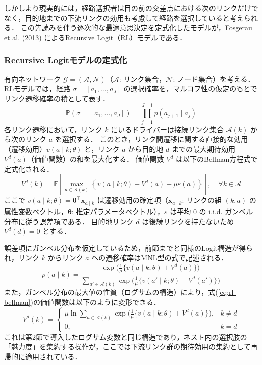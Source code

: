 しかしより現実的には，経路選択者は目の前の交差点における次のリンクだけでなく，目的地までの下流リンクの効用も考慮して経路を選択していると考えられる．
この先読みを伴う逐次的な最適意思決定を定式化したモデルが，Fosgerau et al. (2013) \cite{Fosgerau2013} によるRecursive Logit（RL）モデルである．

\subsubsection{Recursive Logitモデルの定式化}
有向ネットワーク $\mathcal{G} = (\mathcal{A}, \mathcal{N})$（$\mathcal{A}$: リンク集合，$\mathcal{N}$: ノード集合）を考える．
RLモデルでは，経路 $\sigma = [a_1, \ldots, a_J]$ の選択確率を，マルコフ性の仮定のもとでリンク遷移確率の積として表す．
\begin{equation}\label{eq:rl-path}
  \mathbb{P}(\sigma = [a_1, \ldots, a_J]) = \prod_{j=1}^{J-1} p(a_{j+1} \mid a_j)
\end{equation}
各リンク遷移において，リンク $k$ にいるドライバーは接続リンク集合 $\mathcal{A}(k)$ から次のリンク $a$ を選択する．
このとき，リンク間遷移に関する直接的な効用（遷移効用）$v(a \mid k; \theta)$ と，リンク $a$ から目的地 $d$ までの最大期待効用 $V^d(a)$（価値関数）の和を最大化する．
価値関数 $V^d$ は以下のBellman方程式で定式化される．
\begin{equation}\label{eq:rl-bellman}
  V^d(k) = \mathbb{E}\left[\max_{a \in \mathcal{A}(k)} \left\{ v(a \mid k; \theta) + V^d(a) + \mu \varepsilon(a) \right\} \right], \quad \forall k \in \mathcal{A}
\end{equation}
ここで $v(a \mid k; \theta) = \bm{\theta}^\top \bm{x}_{a \mid k}$ は遷移効用の確定項（$\bm{x}_{a \mid k}$: リンクの組 $(k,a)$ の属性変数ベクトル，$\bm{\theta}$: 推定パラメータベクトル），$\varepsilon$ は平均 0 の i.i.d. ガンベル分布に従う誤差項である．
目的地リンク $d$ は後続リンクを持たないため $V^d(d) = 0$ とする．

誤差項にガンベル分布を仮定しているため，前節までと同様のLogit構造が得られ，リンク $k$ からリンク $a$ への遷移確率はMNL型の式で記述される．
\begin{equation}\label{eq:rl-linkprob}
  p(a \mid k) = \frac{\exp\bigl(\frac{1}{\mu}\{v(a \mid k; \theta) + V^d(a)\}\bigr)}{\displaystyle\sum_{a' \in \mathcal{A}(k)} \exp\bigl(\frac{1}{\mu}\{v(a' \mid k; \theta) + V^d(a')\}\bigr)}
\end{equation}
また，ガンベル分布の最大値の性質（ログサムの構造）により，式(\ref{eq:rl-bellman})の価値関数は以下のように変形できる．
\begin{equation}\label{eq:rl-value-logsum}
  V^d(k) = \begin{cases}
    \mu \ln \displaystyle\sum_{a \in \mathcal{A}(k)} \exp\bigl(\frac{1}{\mu}\{v(a \mid k; \theta) + V^d(a)\}\bigr), & k \neq d \\
    0, & k = d
  \end{cases}
\end{equation}
これは第2節で導入したログサム変数と同じ構造であり，ネスト内の選択肢の「魅力度」を集約する操作が，ここでは下流リンク群の期待効用の集約として再帰的に適用されている．

